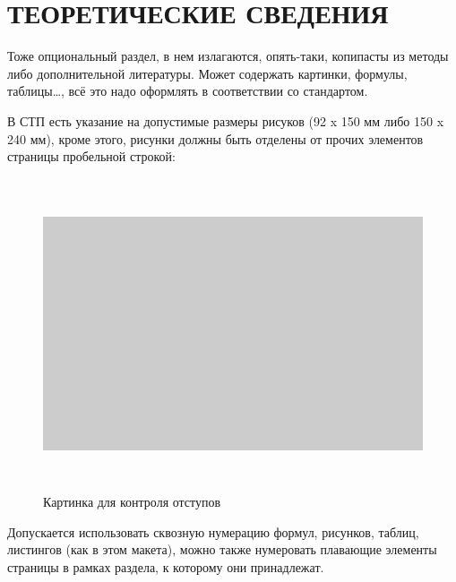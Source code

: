 \section{ТЕОРЕТИЧЕСКИЕ СВЕДЕНИЯ}

Тоже опциональный раздел, в нем излагаются, опять-таки, копипасты из методы либо
дополнительной литературы.
Может содержать картинки, формулы, таблицы\dots, всё это надо оформлять
в соответствии со стандартом.

В СТП есть указание на допустимые размеры рисуков (92 x 150 мм либо 150 x 240 мм),
кроме этого, рисунки должны быть отделены от прочих элементов страницы пробельной строкой:

  \begin{figure}[htbp]
    \centering
    \includegraphics[width=150mm,height=92mm]{fig/scheme_p}
    \caption{Картинка для контроля отступов}
  \end{figure}

Допускается использовать сквозную нумерацию формул, рисунков, таблиц, листингов (как в этом макета),
можно также нумеровать плавающие элементы страницы в рамках раздела, к которому они принадлежат.
